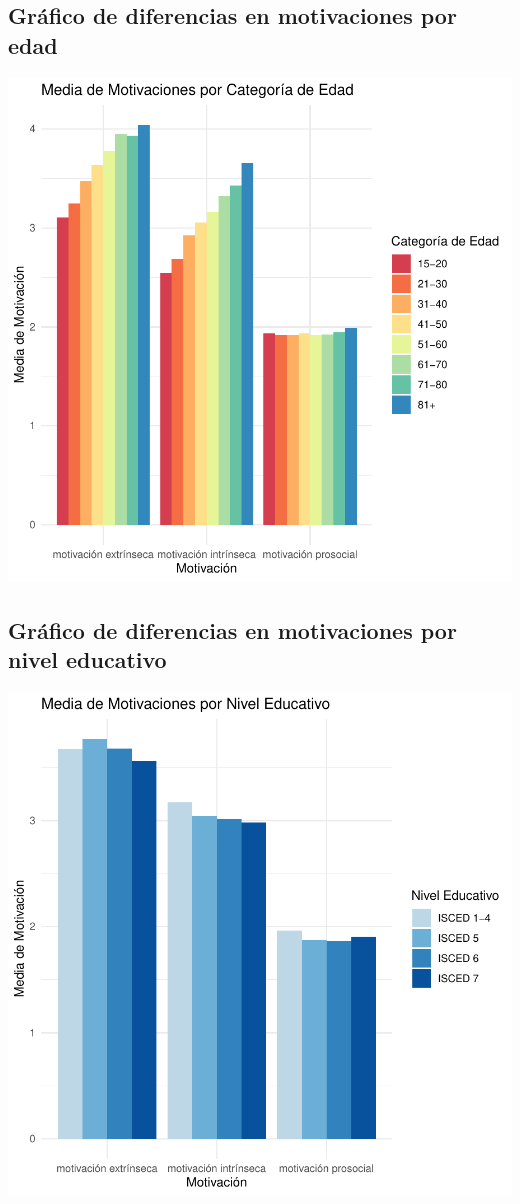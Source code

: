 \documentclass{article}
\begin{document}
\subsection{Gráfico de diferencias en motivaciones por edad}
\includegraphics{Ejemplo-006}


\subsection{Gráfico de diferencias en motivaciones por nivel educativo}
\includegraphics{Ejemplo-007}
\end{document}
